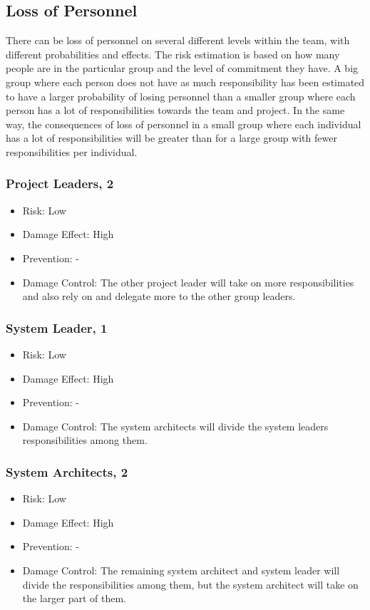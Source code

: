 \documentclass[a4paper]{article}
\begin{document}
\subsection{Loss of Personnel}
There can be loss of personnel on several different levels within the team, with different probabilities and effects. The risk estimation is based on how many people are in the particular group and the level of commitment they have. A big group where each person does not have as much responsibility has been estimated to have a larger probability of losing personnel than a smaller group where each person has a lot of responsibilities towards the team and project. In the same way, the consequences of loss of personnel in a small group where each individual has a lot of responsibilities will be greater than for a large group with fewer responsibilities per individual.


\subsubsection{Project Leaders, 2}
\begin{itemize}
\item Risk: Low
\item Damage Effect: High
\item Prevention: -
\item Damage Control: The other project leader will take on more responsibilities and also rely on and delegate more to the other group leaders.
\end{itemize}

\subsubsection{System Leader, 1}
\begin{itemize}
\item Risk: Low
\item Damage Effect: High
\item Prevention: -
\item Damage Control: The system architects will divide the system leaders responsibilities among them.
\end{itemize}

\subsubsection{System Architects, 2}
\begin{itemize}
\item Risk: Low
\item Damage Effect: High
\item Prevention: -
\item Damage Control: The remaining system architect and system leader will divide the responsibilities among them, but the system architect will take on the larger part of them.
\end{itemize}
\end{document}
